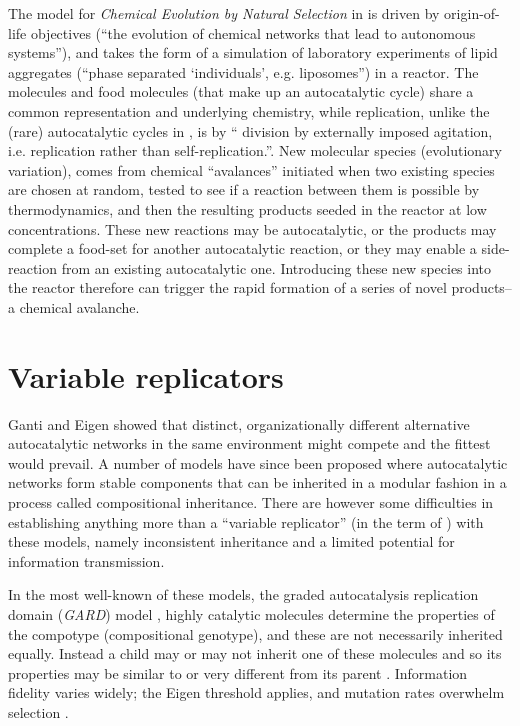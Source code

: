 The model for \emph{Chemical Evolution by Natural Selection} in \textcite{Fernando:2008xy,Fernando:2007pf} is driven by origin-of-life objectives (``the evolution of chemical networks that lead to autonomous systems''), and takes the form of a simulation of laboratory experiments of lipid aggregates (``phase separated ‘individuals’, e.g. liposomes'') in a reactor. The molecules and food molecules (that make up an autocatalytic cycle) share a common representation and underlying chemistry, while replication, unlike the (rare) autocatalytic cycles in \textcite{Faulconbridge2011}, is by `` division by externally imposed agitation, i.e. replication rather than self-replication.''. New molecular species (evolutionary variation), comes from chemical ``avalances'' initiated when two existing species are chosen at random, tested to see if a reaction between them is possible by thermodynamics, and then the resulting products seeded in the reactor at low concentrations. These new reactions may be autocatalytic, or the products may complete a food-set for another autocatalytic reaction, or they may enable a side-reaction from an existing autocatalytic one. Introducing these new species into the reactor therefore can trigger the rapid formation of a series of novel products--a chemical avalanche.

\section{Variable replicators}
Ganti and Eigen showed that distinct, organizationally different alternative autocatalytic networks in the same environment might compete and the fittest would prevail. A number of models have since been proposed where autocatalytic networks form stable components that can be inherited in a modular fashion in a process called compositional inheritance. There are however some difficulties in establishing anything more than a ``variable replicator'' (in the term of \textcite{Zachar2010}) with these models, namely inconsistent inheritance and a limited potential for information transmission.


In the most well-known of these models, the graded autocatalysis replication domain (\emph{GARD}) model \parencite{Segre1998}, highly catalytic molecules determine the properties of the compotype (compositional genotype), and these are not necessarily inherited equally. Instead a child may or may not inherit one of these molecules and so its properties may be similar to or very different from its parent \parencite{Vasas2015, Vasas2012, Vasas2012a}. Information fidelity varies widely; the Eigen threshold applies, and mutation rates overwhelm selection \parencite{Vasas2015, Vasas2012, Vasas2012a}.

